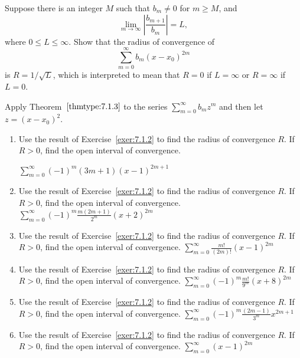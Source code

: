 \documentclass{ximera}
\begin{document}
\begin{problem}\label{exer:7.1.2}
Suppose there is an integer $M$ such that $b_m\ne0$ for $m\ge M$,  and
$$
\lim_{m\to\infty}\left|\frac{b_{m+1}}{b_m}\right|=L,
$$
where $0\le L\le\infty$. Show that the radius of convergence of
$$
\sum_{m=0}^\infty b_m(x-x_0)^{2m}
$$
is $R=1/\sqrt L$,
which is interpreted to mean that $R=0$ if $L=\infty$ or
$R=\infty$ if $L=0$.
\begin{hint}
 Apply Theorem~$\ref{thmtype:7.1.3}$ to the series $\sum_{m=0}^\infty
b_mz^m$ and then let $z=(x-x_0)^2$.   
\end{hint}
\end{problem}

\begin{problem}\label{exer:7.1.3}
\begin{enumerate}

\item Use the result of Exercise~\ref{exer:7.1.2} to find the radius of convergence $R$. If $R>0$, find the open interval of convergence.

$\sum_{m=0}^\infty (-1)^m(3m+1)(x-1)^{2m+1}$

\item Use the result of Exercise~\ref{exer:7.1.2} to find the radius of convergence $R$. If $R>0$, find the open interval of convergence.
$\sum_{m=0}^\infty (-1)^m\frac{m(2m+1)}{2^m}(x+2)^{2m}$ 

\item Use the result of Exercise~\ref{exer:7.1.2} to find the radius of convergence $R$. If $R>0$, find the open interval of convergence.
$\sum_{m=0}^\infty \frac{m!}{(2m)!}(x-1)^{2m}$

\item Use the result of Exercise~\ref{exer:7.1.2} to find the radius of convergence $R$. If $R>0$, find the open interval of convergence.
$\sum_{m=0}^\infty (-1)^m\frac{m!}{9^m}(x+8)^{2m}$

\item Use the result of Exercise~\ref{exer:7.1.2} to find the radius of convergence $R$. If $R>0$, find the open interval of convergence.
$\sum_{m=0}^\infty(-1)^m\frac{(2m-1)}{3^m}x^{2m+1}$

\item Use the result of Exercise~\ref{exer:7.1.2} to find the radius of convergence $R$. If $R>0$, find the open interval of convergence.
$\sum_{m=0}^\infty(x-1)^{2m}$

\end{enumerate}
\end{problem}
\end{document}
